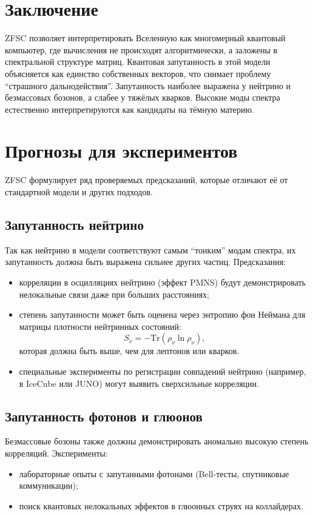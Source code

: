\documentclass[12pt,a4paper]{article}
\begin{document}
\section{Заключение}
ZFSC позволяет интерпретировать Вселенную как многомерный квантовый компьютер, где вычисления не происходят алгоритмически, а заложены в спектральной структуре матриц.
Квантовая запутанность в этой модели объясняется как единство собственных векторов, что снимает проблему ``страшного дальнодействия''.
Запутанность наиболее выражена у нейтрино и безмассовых бозонов, а слабее у тяжёлых кварков.
Высокие моды спектра естественно интерпретируются как кандидаты на тёмную материю.

\section{Прогнозы для экспериментов}

ZFSC формулирует ряд проверяемых предсказаний, которые отличают её от стандартной модели и других подходов.

\subsection{Запутанность нейтрино}
Так как нейтрино в модели соответствуют самым ``тонким'' модам спектра, их запутанность должна быть выражена сильнее других частиц.
Предсказания:
\begin{itemize}
  \item корреляции в осцилляциях нейтрино (эффект PMNS) будут демонстрировать нелокальные связи даже при больших расстояниях;
  \item степень запутанности может быть оценена через энтропию фон Неймана для матрицы плотности нейтринных состояний:
  \[
  S_\nu = - \mathrm{Tr}(\rho_\nu \ln \rho_\nu),
  \]
  которая должна быть выше, чем для лептонов или кварков.
  \item специальные эксперименты по регистрации совпадений нейтрино (например, в IceCube или JUNO) могут выявить сверхсильные корреляции.
\end{itemize}

\subsection{Запутанность фотонов и глюонов}
Безмассовые бозоны также должны демонстрировать аномально высокую степень корреляций.
Эксперименты:
\begin{itemize}
  \item лабораторные опыты с запутанными фотонами (Bell-тесты, спутниковые коммуникации);
  \item поиск квантовых нелокальных эффектов в глюонных струях на коллайдерах.
\end{itemize}
\end{document}
